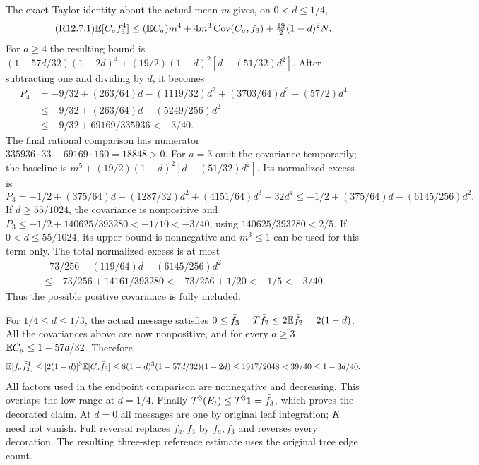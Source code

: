 The exact Taylor identity about the actual mean $m$ gives, on
$0<d\le1/4$,
\begin{equation}\tag{R12.7.1}\label{eq:R12:payment}
\mathbb E[C_a\bar f_3^4]\le(\mathbb E C_a)m^4
+4m^3\operatorname{Cov}(C_a,\bar f_3)
+\tfrac{19}{2}(1-d)^2N.
\end{equation}
For $a\ge4$ the resulting bound is
$(1-57d/32)(1-2d)^4+(19/2)(1-d)^2[d-(51/32)d^2]$.
After subtracting one and dividing by $d$, it becomes
\[
\begin{aligned}
P_4&=-9/32+(263/64)d-(1119/32)d^2+(3703/64)d^3-(57/2)d^4\\
&\le-9/32+(263/64)d-(5249/256)d^2\\
&\le-9/32+69169/335936<-3/40.
\end{aligned}
\]
The final rational comparison has numerator
$335936\cdot33-69169\cdot160=18848>0$.
For $a=3$ omit the covariance temporarily; the baseline is
$m^5+(19/2)(1-d)^2[d-(51/32)d^2]$.
Its normalized excess is
\[
P_3=-1/2+(375/64)d-(1287/32)d^2+(4151/64)d^3-32d^4
\le-1/2+(375/64)d-(6145/256)d^2.
\]
If $d\ge55/1024$, the covariance is nonpositive and
$P_3\le-1/2+140625/393280<-1/10<-3/40$, using
$140625/393280<2/5$.
If $0<d\le55/1024$, its upper bound is nonnegative and $m^3\le1$
can be used for this term only. The total normalized excess is at most
\[
\begin{gathered}
-73/256+(119/64)d-(6145/256)d^2
\\
\le-73/256+14161/393280<-73/256+1/20<-1/5<-3/40.
\end{gathered}
\]
Thus the possible positive covariance is fully included.

For $1/4\le d\le1/3$, the actual message satisfies
$0\le\bar f_3=T\bar f_2\le2\mathbb E\bar f_2=2(1-d)$.
All the covariances above are now nonpositive, and for every $a\ge3$
$\mathbb E C_a\le1-57d/32$. Therefore
\[
\mathbb E[f_a\bar f_3^4]\le[2(1-d)]^3\mathbb E[C_a\bar f_3]
\le8(1-d)^3(1-57d/32)(1-2d)
\le1917/2048<39/40\le1-3d/40.
\]
All factors used in the endpoint comparison are nonnegative and
decreasing. This overlaps the low range at $d=1/4$.
Finally $T^3(E_t)\le T^3\mathbf1=\bar f_3$, which proves the decorated
claim. At $d=0$ all messages are one by original leaf integration;
$K$ need not vanish. Full reversal replaces $f_a,\bar f_3$ by
$\bar f_a,f_3$ and reverses every decoration. The resulting three-step reference estimate uses the original tree edge count.
